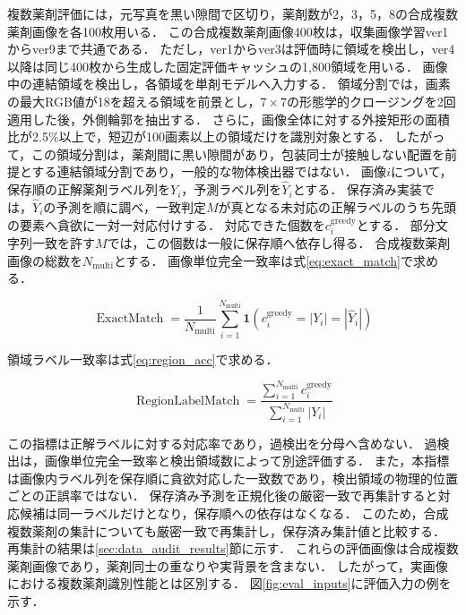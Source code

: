 \documentclass[uplatex,dvipdfmx]{jsarticle}
\begin{document}
複数薬剤評価には，元写真を黒い隙間で区切り，薬剤数が2，3，5，8の合成複数薬剤画像を各100枚用いる．
この合成複数薬剤画像400枚は，収集画像学習ver1からver9まで共通である．
ただし，ver1からver3は評価時に領域を検出し，ver4以降は同じ400枚から生成した固定評価キャッシュの1,800領域を用いる．
画像中の連結領域を検出し，各領域を単剤モデルへ入力する．
領域分割では，画素の最大RGB値が18を超える領域を前景とし，$7\times7$の形態学的クロージングを2回適用した後，外側輪郭を抽出する．
さらに，画像全体に対する外接矩形の面積比が2.5\%以上で，短辺が100画素以上の領域だけを識別対象とする．
したがって，この領域分割は，薬剤間に黒い隙間があり，包装同士が接触しない配置を前提とする連結領域分割であり，一般的な物体検出器ではない．
画像$i$について，保存順の正解薬剤ラベル列を$Y_i$，予測ラベル列を$\hat{Y}_i$とする．
保存済み実装では，$\hat{Y}_i$の予測を順に調べ，一致判定$M$が真となる未対応の正解ラベルのうち先頭の要素へ貪欲に一対一対応付けする．
対応できた個数を$c_i^{\mathrm{greedy}}$とする．
部分文字列一致を許す$M$では，この個数は一般に保存順へ依存し得る．
合成複数薬剤画像の総数を$N_{\mathrm{multi}}$とする．
画像単位完全一致率は式\eqref{eq:exact_match}で求める．

\begin{equation}
  \operatorname{ExactMatch}
  =
  \frac{1}{N_{\mathrm{multi}}}
  \sum_{i=1}^{N_{\mathrm{multi}}}
  \mathbf{1}\!\left(c_i^{\mathrm{greedy}}=|Y_i|=|\hat{Y}_i|\right)
  \label{eq:exact_match}
\end{equation}

領域ラベル一致率は式\eqref{eq:region_acc}で求める．

\begin{equation}
  \operatorname{RegionLabelMatch}
  =
  \frac{\sum_{i=1}^{N_{\mathrm{multi}}}c_i^{\mathrm{greedy}}}
       {\sum_{i=1}^{N_{\mathrm{multi}}}|Y_i|}
  \label{eq:region_acc}
\end{equation}

この指標は正解ラベルに対する対応率であり，過検出を分母へ含めない．
過検出は，画像単位完全一致率と検出領域数によって別途評価する．
また，本指標は画像内ラベル列を保存順に貪欲対応した一致数であり，検出領域の物理的位置ごとの正誤率ではない．
保存済み予測を正規化後の厳密一致で再集計すると対応候補は同一ラベルだけとなり，保存順への依存はなくなる．
このため，合成複数薬剤の集計についても厳密一致で再集計し，保存済み集計値と比較する．
再集計の結果は\ref{sec:data_audit_results}節に示す．
これらの評価画像は合成複数薬剤画像であり，薬剤同士の重なりや実背景を含まない．
したがって，実画像における複数薬剤識別性能とは区別する．
図\ref{fig:eval_inputs}に評価入力の例を示す．
\end{document}
